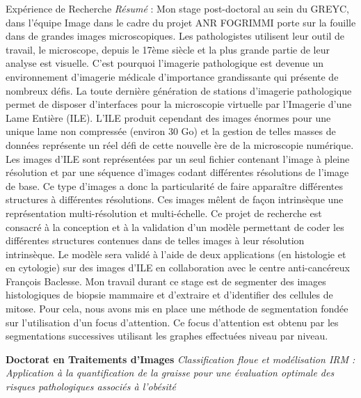 \begin{rubric}{Expérience de Recherche}
  \textit{Résumé} : Mon stage post-doctoral au sein du GREYC, dans
  l'équipe Image dans le cadre du projet ANR FOGRIMMI porte sur la
  fouille dans de grandes images microscopiques. Les pathologistes
  utilisent leur outil de travail, le microscope, depuis le 17ème
  siècle et la plus grande partie de leur analyse est visuelle. C'est
  pourquoi l'imagerie pathologique est devenue un environnement
  d'imagerie médicale d'importance grandissante qui présente de
  nombreux défis. La toute dernière génération de stations d'imagerie
  pathologique permet de disposer d'interfaces pour la microscopie
  virtuelle par l'Imagerie d'une Lame Entière (ILE). L'ILE produit
  cependant des images énormes pour une unique lame non compressée
  (environ 30 Go) et la gestion de telles masses de données représente
  un réel défi de cette nouvelle ère de la microscopie numérique. Les
  images d'ILE sont représentées par un seul fichier contenant l'image
  à pleine résolution et par une séquence d'images codant différentes
  résolutions de l'image de base. Ce type d'images a donc la
  particularité de faire apparaître différentes structures à
  différentes résolutions. Ces images mêlent de façon intrinsèque une
  représentation multi-résolution et multi-échelle. Ce projet de
  recherche est consacré à la conception et à la validation d'un
  modèle permettant de coder les différentes structures contenues dans
  de telles images à leur résolution intrinsèque. Le modèle sera
  validé à l'aide de deux applications (en histologie et en cytologie)
  sur des images d'ILE en collaboration avec le centre anti-cancéreux
  François Baclesse.  Mon travail durant ce stage est de segmenter des
  images histologiques de biopsie mammaire et d'extraire et
  d'identifier des cellules de mitose. Pour cela, nous avons mis en
  place une méthode de segmentation fondée sur l'utilisation d'un
  focus d'attention. Ce focus d'attention est obtenu par les
  segmentations successives utilisant les graphes effectuées niveau
  par niveau.
    
  \entry*[2004--2008]
   \textbf{Doctorat en Traitements d'Images}
  \textit{Classification floue et modélisation IRM : Application à la quantification de la graisse pour une évaluation optimale des risques pathologiques associés à l'obésité}\newline
  

\end{rubric}
